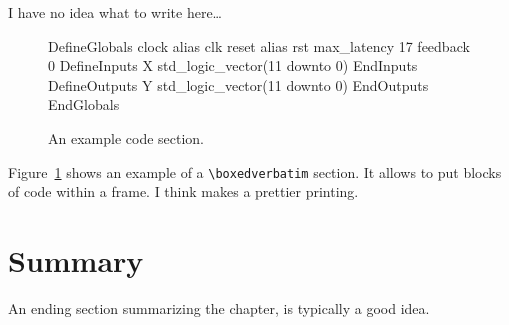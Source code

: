 I have no idea what to write here\dots

\begin{figure}
\begin{boxedverbatim}
DefineGlobals
   clock   alias   clk
   reset   alias   rst
   max_latency     17
   feedback        0
   DefineInputs
      X   std_logic_vector(11 downto 0)
   EndInputs
   DefineOutputs
      Y   std_logic_vector(11 downto 0)
   EndOutputs
EndGlobals
\end{boxedverbatim}
\caption{An example code section.}
\label{chp4:img}
\end{figure}

Figure~\ref{chp4:img} shows an example of a \verb"\boxedverbatim" section. It allows to put blocks of code within a frame. I think makes a prettier printing.

\section{Summary}

An ending section summarizing the chapter, is typically a good idea.

\cleardoublepage

